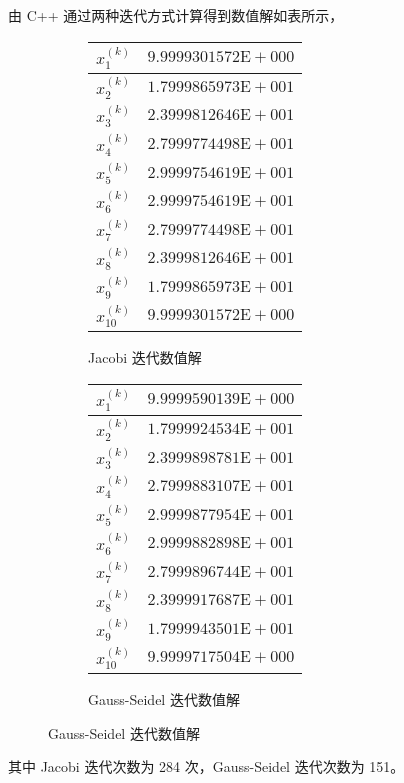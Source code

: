 \documentclass[11pt]{article}
\begin{document}
由 C++ 通过两种迭代方式计算得到数值解如表所示，
\begin{figure}[h]
    \centering
    \begin{subfigure}{.49\textwidth}
        \centering
        \begin{tabular}{|c|c|}
            \hline $x^{(k)}_1$    & $9.9999301572\text{E}{+}000$ \\
            \hline $x^{(k)}_2$    & $1.7999865973\text{E}{+}001$ \\
            \hline $x^{(k)}_3$    & $2.3999812646\text{E}{+}001$ \\
            \hline $x^{(k)}_4$    & $2.7999774498\text{E}{+}001$ \\
            \hline $x^{(k)}_5$    & $2.9999754619\text{E}{+}001$ \\
            \hline $x^{(k)}_6$    & $2.9999754619\text{E}{+}001$ \\
            \hline $x^{(k)}_7$    & $2.7999774498\text{E}{+}001$ \\
            \hline $x^{(k)}_8$    & $2.3999812646\text{E}{+}001$ \\
            \hline $x^{(k)}_9$    & $1.7999865973\text{E}{+}001$ \\
            \hline $x^{(k)}_{10}$ & $9.9999301572\text{E}{+}000$ \\
            \hline
        \end{tabular}
        \caption{Jacobi 迭代数值解}
    \end{subfigure}
    \begin{subfigure}{.49\textwidth}
        \centering
        \begin{tabular}{|c|c|}
            \hline $x^{(k)}_1$    & $9.9999590139\text{E}{+}000$ \\
            \hline $x^{(k)}_2$    & $1.7999924534\text{E}{+}001$ \\
            \hline $x^{(k)}_3$    & $2.3999898781\text{E}{+}001$ \\
            \hline $x^{(k)}_4$    & $2.7999883107\text{E}{+}001$ \\
            \hline $x^{(k)}_5$    & $2.9999877954\text{E}{+}001$ \\
            \hline $x^{(k)}_6$    & $2.9999882898\text{E}{+}001$ \\
            \hline $x^{(k)}_7$    & $2.7999896744\text{E}{+}001$ \\
            \hline $x^{(k)}_8$    & $2.3999917687\text{E}{+}001$ \\
            \hline $x^{(k)}_9$    & $1.7999943501\text{E}{+}001$ \\
            \hline $x^{(k)}_{10}$ & $9.9999717504\text{E}{+}000$ \\
            \hline
        \end{tabular}
        \caption{Gauss-Seidel 迭代数值解}
    \end{subfigure}
\end{figure}
其中 Jacobi 迭代次数为 284 次，Gauss-Seidel 迭代次数为 151。
\end{document}
